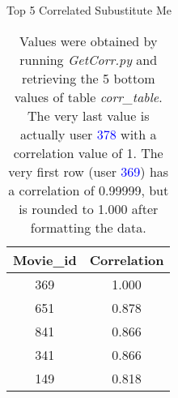 \begin{table}[!htbp]
	\caption{Top 5 Correlated Subustitute Me} \label{tab:top-corr}
	\begin{center}
	\vspace{-5mm}
		\begin{tabular}{ c c }
			\hline
			\multicolumn{1}{c}{Movie\_id} & \multicolumn{1}{c}{Correlation}\\
			\hline
			369    &     1.000 \\
			651    &     0.878 \\
			841    &     0.866 \\
			341    &     0.866 \\
			149    &     0.818 \\
			\hline
		\end{tabular}
	\caption*{\scriptsize Values were obtained by running \textit{GetCorr.py} and retrieving the 5 bottom values of table \textit{corr\_table}. The very last value is actually user \textcolor{blue}{378} with a correlation value of 1. The very first row (user \textcolor{blue}{369}) has a correlation of 0.99999, but is rounded to 1.000 after formatting the data.}
	 \end{center}
\end{table}